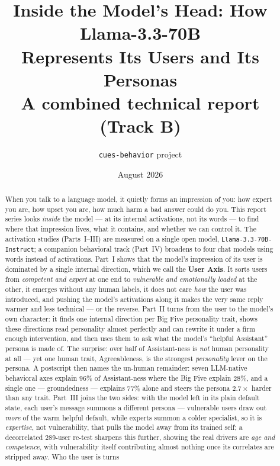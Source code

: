 \documentclass[11pt]{article}
\title{\textbf{Inside the Model's Head: How Llama-3.3-70B\\ Represents Its Users and Its Personas}\\[6pt]
\large A combined technical report (Track B)}
\author{\texttt{cues-behavior} project}
\date{August 2026}
\begin{document}
\maketitle

\begin{abstract}
\noindent
When you talk to a language model, it quietly forms an impression of you: how
expert you are, how upset you are, how much harm a bad answer could do you. This
report series looks \emph{inside} the model --- at its internal activations, not
its words --- to find where that impression lives, what it contains, and whether
we can control it. The activation studies (Parts~I--III) are measured on a
single open model, \texttt{Llama-3.3-70B-Instruct}; a companion behavioral
track (Part~IV) broadens to four chat models using words instead of
activations. Part~I shows that the model's impression of its
user is dominated by a single internal direction, which we call the
\textbf{User Axis}. It sorts users from \emph{competent and expert} at one end to
\emph{vulnerable and emotionally loaded} at the other, it emerges without any
human labels, it does not care \emph{how} the user was introduced, and pushing
the model's activations along it makes the very same reply warmer and less
technical --- or the reverse. Part~II turns from the user to the model's own
character: it finds one internal direction per Big Five personality trait, shows
these directions read personality almost perfectly and can rewrite it under a
firm enough intervention, and then uses them to ask what the model's ``helpful
Assistant'' persona is made of. The surprise: over half of Assistant-ness is
\emph{not} human personality at all --- yet one human trait, Agreeableness, is
the strongest \emph{personality} lever on the persona. A postscript then names
the un-human remainder: seven LLM-native behavioral axes explain 96\% of
Assistant-ness where the Big Five explain 28\%, and a single one ---
groundedness --- explains 77\% alone and steers the persona $2.7\times$
harder than any trait. Part~III joins the two
sides: with the model left in its plain default state, each user's message
summons a different persona --- vulnerable users draw out \emph{more} of the
warm helpful default, while experts summon a colder specialist, so it is
\emph{expertise}, not vulnerability, that pulls the model away from its trained
self; a decorrelated 289-user re-test sharpens this further, showing the real
drivers are \emph{age and competence}, with vulnerability itself contributing
almost nothing once its correlates are stripped away. Who the user is turns

\end{abstract}
\end{document}
